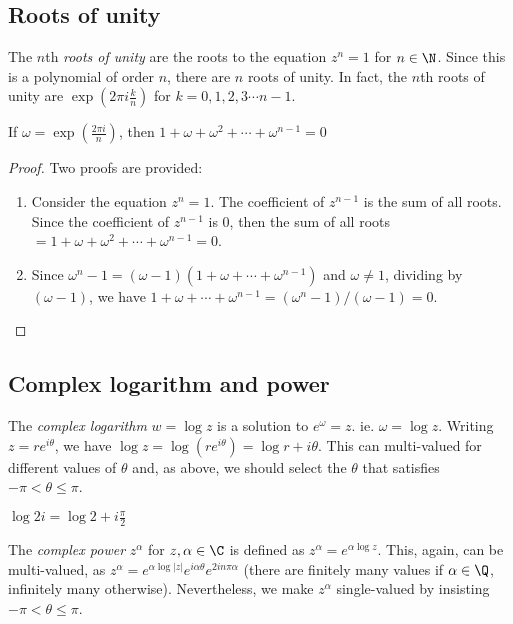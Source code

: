 \documentclass[a4paper]{article}
\begin{document}
\subsection{Roots of unity}
\begin{defi}
  The $n$th \emph{roots of unity} are the roots to the equation $z^n = 1$ for $n\in \N$. Since this is a polynomial of order $n$, there are $n$ roots of unity. In fact, the $n$th roots of unity are $\exp\left(2\pi i\frac{k}{n}\right)$ for $k = 0, 1, 2, 3\cdots n - 1$.
\end{defi}

\begin{prop}
  If $\omega = \exp\left(\frac{2\pi i}{n}\right)$, then $1 + \omega + \omega^2 + \cdots + \omega^{n - 1} = 0$
\end{prop}

\begin{proof}
  Two proofs are provided:
  \begin{enumerate}
    \item Consider the equation $z^n = 1$. The coefficient of $z^{n-1}$ is the sum of all roots. Since the coefficient of $z^{n-1}$ is 0, then the sum of all roots $= 1 + \omega + \omega^2 + \cdots + \omega^{n-1} = 0$.
    \item Since $\omega^n - 1 = (\omega - 1)(1 + \omega + \cdots + \omega^{n - 1})$ and $\omega \not= 1$, dividing by $(\omega - 1)$, we have $1 + \omega + \cdots + \omega^{n-1} = (\omega^n - 1)/(\omega - 1) = 0$.
  \end{enumerate}
\end{proof}

\subsection{Complex logarithm and power}
\begin{defi}
  The \emph{complex logarithm} $w = \log z$ is a solution to $e^\omega = z$. ie. $\omega = \log z$. Writing $z = re^{i\theta}$, we have $\log z = \log(re^{i\theta}) = \log r + i\theta$. This can multi-valued for different values of $\theta$ and, as above, we should select the $\theta$ that satisfies $-\pi < \theta \leq \pi$.
\end{defi}
\begin{eg}
  $\log 2i = \log 2 + i\frac{\pi}{2}$
\end{eg}

\begin{defi}
  The \emph{complex power} $z^\alpha$ for $z, \alpha\in \C$ is defined as $z^\alpha = e^{\alpha\log z}$. This, again, can be multi-valued, as $z^\alpha = e^{\alpha\log|z|}e^{i\alpha\theta}e^{2in\pi\alpha}$ (there are finitely many values if $\alpha\in\Q$, infinitely many otherwise). Nevertheless, we make $z^\alpha$ single-valued by insisting $-\pi < \theta \leq \pi$.
\end{defi}
\end{document}

